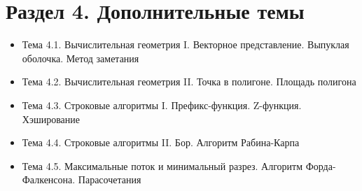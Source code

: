 \documentclass[a4paper,11pt]{article}
\begin{document}
\section*{Раздел 4. Дополнительные темы}
\begin{itemize}
\item Тема 4.1. Вычислительная геометрия I. Векторное представление. Выпуклая оболочка. Метод заметания
\item Тема 4.2. Вычислительная геометрия II. Точка в полигоне. Площадь полигона
\item Тема 4.3. Строковые алгоритмы I. Префикс-функция. Z-функция. Хэширование
\item Тема 4.4. Строковые алгоритмы II. Бор. Алгоритм Рабина-Карпа
\item Тема 4.5. Максимальные поток и минимальный разрез. Алгоритм Форда-Фалкенсона. Парасочетания
\end{itemize}
\end{document}
